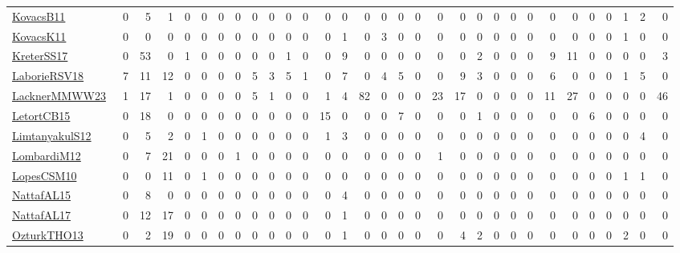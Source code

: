 \documentclass[a4paper]{article}
\begin{document}
{\begin{longtable}{l*{30}{r}}
\href{articles/KovacsB11.pdf}{KovacsB11}~\cite{KovacsB11} & 0 & 5 & 1 & 0 & 0 & 0 & 0 & 0 & 0 & 0 & 0 & 0 & 0 & 0 & 0 & 0 & 0 & 0 & 0 & 0 & 0 & 0 & 0 & 0 & 0 & 0 & 0 & 1 & 2 & 0\\
\href{articles/KovacsK11.pdf}{KovacsK11}~\cite{KovacsK11} & 0 & 0 & 0 & 0 & 0 & 0 & 0 & 0 & 0 & 0 & 0 & 0 & 1 & 0 & 3 & 0 & 0 & 0 & 0 & 0 & 0 & 0 & 0 & 0 & 0 & 0 & 0 & 1 & 0 & 0\\
\href{articles/KreterSS17.pdf}{KreterSS17}~\cite{KreterSS17} & 0 & 53 & 0 & 1 & 0 & 0 & 0 & 0 & 0 & 1 & 0 & 0 & 9 & 0 & 0 & 0 & 0 & 0 & 0 & 2 & 0 & 0 & 0 & 9 & 11 & 0 & 0 & 0 & 0 & 3\\
\href{articles/LaborieRSV18.pdf}{LaborieRSV18}~\cite{LaborieRSV18} & 7 & 11 & 12 & 0 & 0 & 0 & 0 & 5 & 3 & 5 & 1 & 0 & 7 & 0 & 4 & 5 & 0 & 0 & 9 & 3 & 0 & 0 & 0 & 6 & 0 & 0 & 0 & 1 & 5 & 0\\
\href{articles/LacknerMMWW23.pdf}{LacknerMMWW23}~\cite{LacknerMMWW23} & 1 & 17 & 1 & 0 & 0 & 0 & 0 & 5 & 1 & 0 & 0 & 1 & 4 & 82 & 0 & 0 & 0 & 23 & 17 & 0 & 0 & 0 & 0 & 11 & 27 & 0 & 0 & 0 & 0 & 46\\
\href{articles/LetortCB15.pdf}{LetortCB15}~\cite{LetortCB15} & 0 & 18 & 0 & 0 & 0 & 0 & 0 & 0 & 0 & 0 & 0 & 15 & 0 & 0 & 0 & 7 & 0 & 0 & 0 & 1 & 0 & 0 & 0 & 0 & 0 & 6 & 0 & 0 & 0 & 0\\
\href{articles/LimtanyakulS12.pdf}{LimtanyakulS12}~\cite{LimtanyakulS12} & 0 & 5 & 2 & 0 & 1 & 0 & 0 & 0 & 0 & 0 & 0 & 1 & 3 & 0 & 0 & 0 & 0 & 0 & 0 & 0 & 0 & 0 & 0 & 0 & 0 & 0 & 0 & 0 & 4 & 0\\
\href{articles/LombardiM12.pdf}{LombardiM12}~\cite{LombardiM12} & 0 & 7 & 21 & 0 & 0 & 0 & 1 & 0 & 0 & 0 & 0 & 0 & 0 & 0 & 0 & 0 & 0 & 1 & 0 & 0 & 0 & 0 & 0 & 0 & 0 & 0 & 0 & 0 & 0 & 0\\
\href{articles/LopesCSM10.pdf}{LopesCSM10}~\cite{LopesCSM10} & 0 & 0 & 11 & 0 & 1 & 0 & 0 & 0 & 0 & 0 & 0 & 0 & 0 & 0 & 0 & 0 & 0 & 0 & 0 & 0 & 0 & 0 & 0 & 0 & 0 & 0 & 0 & 1 & 1 & 0\\
\href{articles/NattafAL15.pdf}{NattafAL15}~\cite{NattafAL15} & 0 & 8 & 0 & 0 & 0 & 0 & 0 & 0 & 0 & 0 & 0 & 0 & 4 & 0 & 0 & 0 & 0 & 0 & 0 & 0 & 0 & 0 & 0 & 0 & 0 & 0 & 0 & 0 & 0 & 0\\
\href{articles/NattafAL17.pdf}{NattafAL17}~\cite{NattafAL17} & 0 & 12 & 17 & 0 & 0 & 0 & 0 & 0 & 0 & 0 & 0 & 0 & 1 & 0 & 0 & 0 & 0 & 0 & 0 & 0 & 0 & 0 & 0 & 0 & 0 & 0 & 0 & 0 & 0 & 0\\
\href{articles/OzturkTHO13.pdf}{OzturkTHO13}~\cite{OzturkTHO13} & 0 & 2 & 19 & 0 & 0 & 0 & 0 & 0 & 0 & 0 & 0 & 0 & 1 & 0 & 0 & 0 & 0 & 0 & 4 & 2 & 0 & 0 & 0 & 0 & 0 & 0 & 0 & 2 & 0 & 0\\

\end{longtable}}
\end{document}
